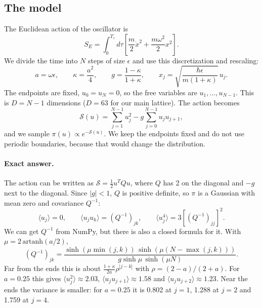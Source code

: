 \documentclass[11pt]{article}
\begin{document}
\subsection{The model}
The Euclidean action of the oscillator is
\begin{equation}
  S_E = \int_0^{T_\tau} d\tau \left[ \frac{m}{2}\dot x^2 + \frac{m\omega^2}{2}x^2 \right].
\end{equation}
We divide the time into $N$ steps of size $\epsilon$ and use this discretization and rescaling:
\begin{equation}
  a = \omega\epsilon, \qquad \kappa = \frac{a^2}{4}, \qquad g = \frac{1-\kappa}{1+\kappa}, \qquad x_j = \sqrt{\frac{\hbar\epsilon}{m(1+\kappa)}}\, u_j .
\end{equation}
The endpoints are fixed, $u_0 = u_N = 0$, so the free variables are $u_1, \dots, u_{N-1}$. This is $D = N-1$ dimensions ($D = 63$ for our main lattice). The action becomes
\begin{equation}
  \mathcal S(u) = \sum_{j=1}^{N-1} u_j^2 - g \sum_{j=0}^{N-1} u_j u_{j+1},
  \label{eq:action}
\end{equation}
and we sample $\pi(u) \propto e^{-\mathcal S(u)}$. We keep the endpoints fixed and do not use periodic boundaries, because that would change the distribution.

\paragraph{Exact answer.} The action can be written as $\mathcal S = \frac12 u^T Q u$, where $Q$ has 2 on the diagonal and $-g$ next to the diagonal. Since $|g| < 1$, $Q$ is positive definite, so $\pi$ is a Gaussian with mean zero and covariance $Q^{-1}$:
\begin{equation}
  \langle u_j \rangle = 0, \qquad \langle u_j u_k \rangle = (Q^{-1})_{jk}, \qquad \langle u_j^4 \rangle = 3 \left[(Q^{-1})_{jj}\right]^2 .
  \label{eq:exact}
\end{equation}
We can get $Q^{-1}$ from NumPy, but there is also a closed formula for it. With $\mu = 2\,\mathrm{artanh}(a/2)$,
\begin{equation}
  (Q^{-1})_{jk} = \frac{\sinh(\mu \min(j,k))\, \sinh(\mu(N-\max(j,k)))}{g \sinh\mu \, \sinh(\mu N)} .
  \label{eq:Qinv}
\end{equation}
Far from the ends this is about $\frac{1+\kappa}{2a}\rho^{|j-k|}$ with $\rho = (2-a)/(2+a)$. For $a = 0.25$ this gives $\langle u_j^2\rangle \approx 2.03$, $\langle u_j u_{j+1}\rangle \approx 1.58$ and $\langle u_j u_{j+2}\rangle \approx 1.23$. Near the ends the variance is smaller: for $a = 0.25$ it is 0.802 at $j = 1$, 1.288 at $j = 2$ and 1.759 at $j = 4$.
\end{document}
